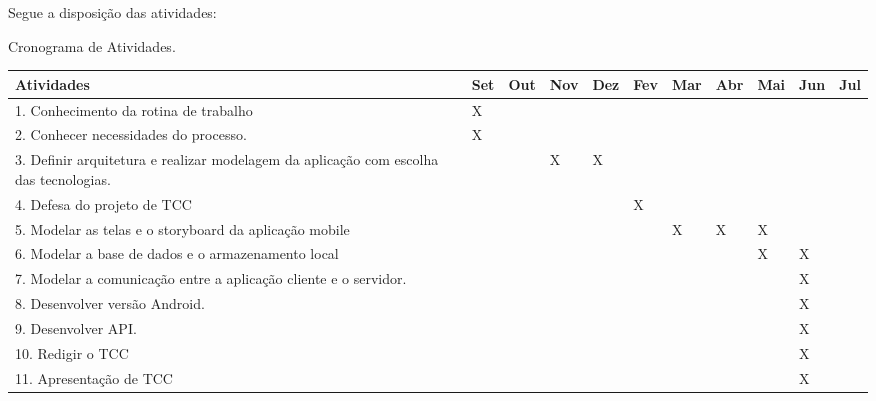 Segue a disposição das atividades:

\begin{quadro}[!htb]
    \caption{Cronograma de Atividades.\label{qua:quadro1}}
    \begin{tabular}{|p{4.5cm}|p{0.7cm}|p{0.7cm}|p{0.7cm}|p{0.7cm}|p{0.7cm}|p{0.7cm}|p{0.7cm}|p{0.7cm}|p{0.7cm}|p{0.7cm}|}
        \hline
        \textbf{Atividades} & \textbf{Set} & \textbf{Out} & \textbf{Nov} & \textbf{Dez} & \textbf{Fev} & \textbf{Mar} & \textbf{Abr} & \textbf{Mai} & \textbf{Jun} & \textbf{Jul}\\
        \hline
        \small{1. Conhecimento da rotina de trabalho} & X &   &   &   &   &   &   &   &   &  \\
        \hline
        \small{2. Conhecer necessidades do processo.} & X &   &   &   &   &   &   &   &   &  \\
        \hline
	\small{3. Definir arquitetura e realizar modelagem da aplicação com escolha das tecnologias.} &   &   & X & X &   &   &   &   &   &  \\
        \hline
	\small{4. Defesa do projeto de TCC} &   &   &   &   & X &   &   &   &   &  \\
        \hline
	\small{5. Modelar as telas e o storyboard da aplicação mobile} &   &   &   &   &   & X & X  & X &   &  \\
        \hline
	\small{6. Modelar a base de dados e o armazenamento local} &   &   &   &   &   &   &   & X & X &  \\
        \hline
	\small{7. Modelar a comunicação entre a aplicação cliente e o servidor.} &   &   &   &   &   &   &   &   & X &  \\
        \hline
    	\small{8. Desenvolver versão Android.} &   &   &   &   &   &   &   &   & X &  \\
    \hline
    	\small{9. Desenvolver API.} &   &   &   &   &   &   &   &   & X &  \\
    \hline
    	\small{10. Redigir o TCC} &   &   &   &   &   &   &   &   & X &  \\
    \hline
    	\small{11. Apresentação de TCC} &   &   &   &   &   &   &   &   & X &  \\
    \hline
    \end{tabular}
\end{quadro}



